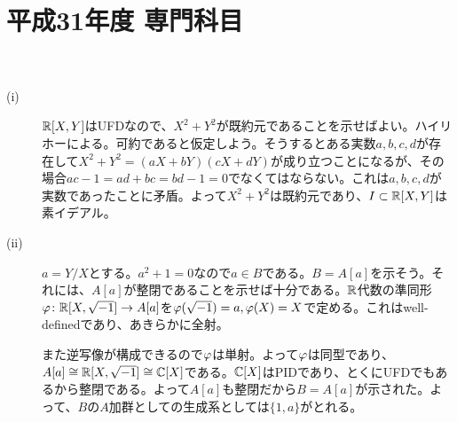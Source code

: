\section{平成31年度 専門科目}

\subsubsection{} %
\begin{sol} ${}$
  \begin{description}
    \item[(i)] ${\mathbb R}[X,Y]$はUFDなので、$X^2 + Y^2$が既約元であることを示せばよい。ハイリホーによる。可約であると仮定しよう。そうするとある実数$a,b,c,d $が存在して$X^2 + Y^2 = (aX + bY)(cX + dY)$が成り立つことになるが、その場合$ac - 1 = ad + bc = bd - 1 = 0$でなくてはならない。これは$a,b,c,d$が実数であったことに矛盾。よって$X^2 + Y^2$は既約元であり、$I \subset {\mathbb R}[X,Y]$は素イデアル。
    \item[(ii)] $a = Y/X$とする。$a^2 + 1 = 0$なので$a \in B$である。$B = A[a]$を示そう。それには、$A[a]$が整閉であることを示せば十分である。${\mathbb R}$代数の準同形${\varphi} \colon {\mathbb R}[X,\sqrt{-1}] \to A[a]$を${\varphi}(\sqrt{-1})=a, {\varphi}(X)=X$で定める。これはwell-definedであり、あきらかに全射。

    また逆写像が構成できるので${\varphi}$は単射。よって${\varphi}$は同型であり、$A[a] \cong {\mathbb R}[X,\sqrt{-1}] \cong {\mathbb C}[X]$である。${\mathbb C}[X]$はPIDであり、とくにUFDでもあるから整閉である。よって$A[a]$も整閉だから$B = A[a]$が示された。よって、$B$の$A$加群としての生成系としては$\{ 1, a \}$がとれる。
  \end{description}
\end{sol}


\newpage

